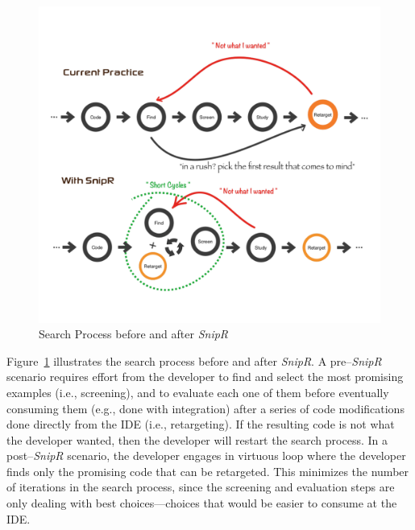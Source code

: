 \begin{figure}[!ht]
    \centering
    \includegraphics[width=\textwidth,height=0.8\textheight,keepaspectratio]{images/searchprocess}
    \caption{Search Process before and after \emph{SnipR}}
    \label{fig:retargeting}
\end{figure}

Figure~\ref{fig:retargeting} illustrates the search process before and after \emph{SnipR}. A pre--\emph{SnipR} scenario requires effort from the developer to find and select the most promising examples (i.e., screening), and to evaluate each one of them before eventually consuming them (e.g., done with integration) after a series of code modifications done directly from the IDE (i.e., retargeting). If the resulting code is not what the developer wanted, then the developer will restart the search process. In a post--\emph{SnipR} scenario, the developer engages in virtuous loop where the developer finds only the promising code that can be retargeted. This minimizes the number of iterations in the search process, since the screening and evaluation steps are only dealing with best choices---choices that would be easier to consume at the IDE.


